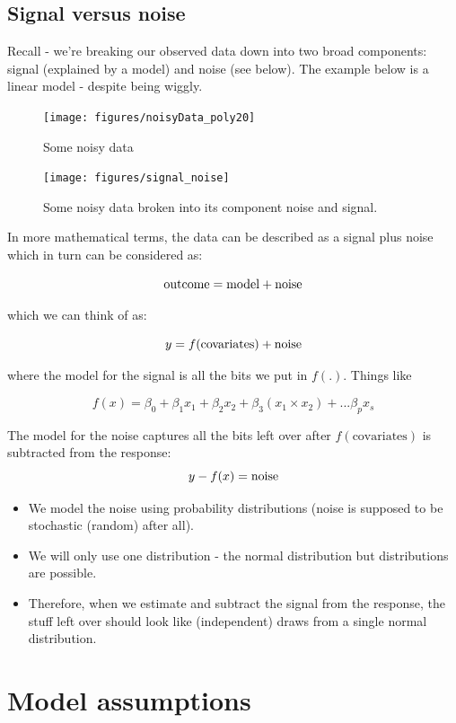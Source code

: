 \documentclass[
  oneside]{krantz}
\providecommand{\tightlist}{%
  \setlength{\itemsep}{0pt}\setlength{\parskip}{0pt}}
\begin{document}
\hypertarget{signal-versus-noise}{%
\subsection{Signal versus noise}\label{signal-versus-noise}}

Recall - we're breaking our observed data down into two broad components: signal (explained by a model) and noise (see below). The example below is a linear model - despite being wiggly.

\begin{figure}[h!]
\centering
\texttt{[image: figures/noisyData\_poly20]}
\caption{Some noisy data}
\end{figure}

\begin{figure}[h!]
\centering
\texttt{[image: figures/signal\_noise]}
\caption{Some noisy data broken into its component noise and signal.}
\end{figure}

In more mathematical terms, the data can be described as a signal plus noise which in turn can be considered as:

\[{\rm outcome} = {\rm model} + \rm{noise}\]

which we can think of as:

\[y=f({\rm covariates}) + {\rm noise}\]

where the model for the signal is all the bits we put in \(f(.)\). Things like

\[f(x) = \beta_0 + \beta_1x_1 + \beta_2 x_2 + \beta_3(x_1 \times x_2) + ... \beta_p x_s\]

The model for the noise captures all the bits left over after \(f(\textrm{covariates})\) is subtracted from the response:
\[y - f(x) = {\rm noise}\]

\begin{itemize}
\tightlist
\item
  We model the noise using probability distributions (noise is supposed to be stochastic (random) after all).
\item
  We will only use one distribution - the normal distribution but distributions are possible.
\item
  Therefore, when we estimate and subtract the signal from the response, the stuff left over should look like (independent) draws from a single normal distribution.
\end{itemize}

\hypertarget{model-assumptions}{%
\section{Model assumptions}\label{model-assumptions}}
\end{document}

